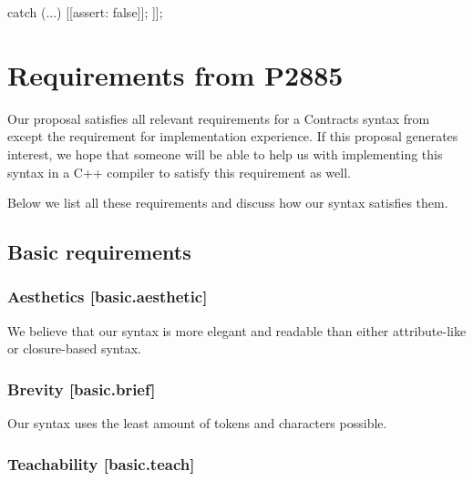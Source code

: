 \begin{minipage}{8cm}
\begin{codeblock}
    catch (...) {
      [[assert: false]];
    }
  ]];
\end{codeblock}
\end{minipage}
\begin{minipage}{8cm}
\begin{codeblock}
  catch (...) {
    contract_assert(false);
  }
};
\end{codeblock}
\end{minipage}



\section{Requirements from P2885}
\label{sec:requirements}

Our proposal satisfies all relevant requirements for a Contracts syntax from \cite{P2885R3} except the requirement for implementation experience. If this proposal generates interest, we hope that someone will be able to help us with implementing this syntax in a C++ compiler to satisfy this requirement as well.

Below we list all these requirements and discuss how our syntax satisfies them.

\subsection{Basic requirements}

\subsubsection{Aesthetics  [basic.aesthetic]}

We believe that our syntax is more elegant and readable than either attribute-like or closure-based syntax.

\subsubsection{Brevity  [basic.brief]}

Our syntax uses the least amount of tokens and characters possible.

\subsubsection{Teachability  [basic.teach]}

